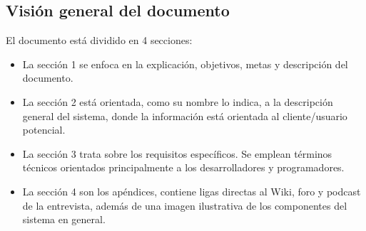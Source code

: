 
\subsection{Visión general del documento}

El documento está dividido en 4 secciones: 

\begin{itemize}
\item La sección 1 se enfoca en la explicación, objetivos, metas y descripción del documento. 
\item La sección 2 está orientada, como su nombre lo indica, a la descripción general del sistema, donde la información está orientada al cliente/usuario potencial. 
\item La sección 3 trata sobre los requisitos específicos. Se emplean términos técnicos orientados principalmente a los desarrolladores y programadores.
\item La sección 4 son los apéndices, contiene ligas directas al Wiki, foro y podcast de la entrevista, además de una imagen ilustrativa de los componentes del sistema en general.
\end{itemize}



